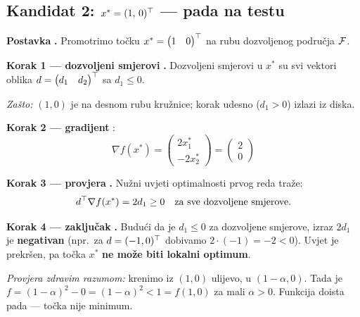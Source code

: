 \subsection{Kandidat 2: $x^{*} = (1,\,0)^{\top}$ --- pada na testu}

\textbf{Postavka} \textbf{.} Promotrimo točku
$x^{*} = \begin{pmatrix} 1 & 0\end{pmatrix}^{\top}$ na rubu dozvoljenog područja
$\mathcal{F}$.

\textbf{Korak 1 --- dozvoljeni smjerovi} \textbf{.} Dozvoljeni smjerovi
u $x^{*}$ su svi vektori oblika $d = \begin{pmatrix} d_1 & d_2\end{pmatrix}^{\top}$
sa $d_1 \le 0$.

\emph{Zašto:} $(1,0)$ je na desnom rubu kružnice; korak udesno ($d_1 > 0$)
izlazi iz diska.

\textbf{Korak 2 --- gradijent} :
\[
\nabla f(x^{*}) = \begin{pmatrix} 2x_1^{*} \\ -2x_2^{*}\end{pmatrix}
= \begin{pmatrix} 2 \\ 0 \end{pmatrix}
\]

\textbf{Korak 3 --- provjera} \textbf{.} Nužni uvjeti optimalnosti
prvog reda traže:
\[
d^{\top}\nabla f(x^{*}) = 2d_1 \ge 0 \quad\text{za sve dozvoljene smjerove.}
\]

\textbf{Korak 4 --- zaključak} \textbf{.} Budući da je $d_1 \le 0$ za
dozvoljene smjerove, izraz $2d_1$ je \textbf{negativan} (npr.\ za
$d = (-1, 0)^{\top}$ dobivamo $2\cdot(-1) = -2 < 0$). Uvjet je prekršen, pa točka
$x^{*}$ \textbf{ne može biti lokalni optimum}.

\emph{Provjera zdravim razumom:} krenimo iz $(1,0)$ ulijevo, u $(1-\alpha, 0)$.
Tada je $f = (1-\alpha)^2 - 0 = (1-\alpha)^2 < 1 = f(1,0)$ za mali $\alpha>0$.
Funkcija doista pada --- točka nije minimum. \checkmark

